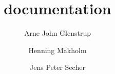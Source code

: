\documentclass[twoside]{cmixdoc}
\title{\cmix documentation}
\author{Arne John Glenstrup \and Henning Makholm \and Jens Peter Secher}
\begin{document}
\shortindexingon



\newenvironment{docpart}{\let\maketitle\relax}{}
\def\title#1{}
\def\author#1{}






















\appendix



\end{document}
